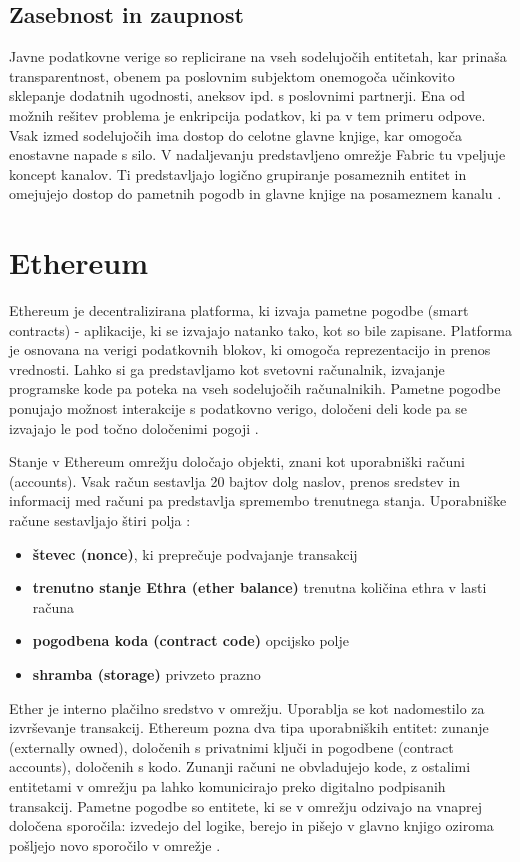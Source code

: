 \documentclass[a4paper, 12pt]{book}
\begin{document}
\subsection{Zasebnost in zaupnost}
Javne podatkovne verige so replicirane na vseh sodelujočih entitetah, kar prinaša transparentnost, obenem pa poslovnim subjektom onemogoča učinkovito sklepanje dodatnih ugodnosti, aneksov ipd. s poslovnimi partnerji.
Ena od možnih rešitev problema je enkripcija podatkov, ki pa v tem primeru odpove.
Vsak izmed sodelujočih ima dostop do celotne glavne knjige, kar omogoča enostavne napade s silo.
V nadaljevanju predstavljeno omrežje Fabric tu vpeljuje koncept kanalov.
Ti predstavljajo logično grupiranje posameznih entitet in omejujejo dostop do pametnih pogodb in glavne knjige na posameznem kanalu \cite{hyperledgerDocs}.

\section{Ethereum}
Ethereum je decentralizirana platforma, ki izvaja pametne pogodbe (smart contracts) - aplikacije, ki se izvajajo natanko tako, kot so bile zapisane.
Platforma je osnovana na verigi podatkovnih blokov, ki omogoča reprezentacijo in prenos vrednosti.
Lahko si ga predstavljamo kot svetovni računalnik, izvajanje programske kode pa poteka na vseh sodelujočih računalnikih.
Pametne pogodbe ponujajo možnost interakcije s podatkovno verigo, določeni deli kode pa se izvajajo le pod točno določenimi pogoji \cite{ethereumWhitepaper}.

Stanje v Ethereum omrežju določajo objekti, znani kot uporabniški računi (accounts).
Vsak račun sestavlja 20 bajtov dolg naslov, prenos sredstev in informacij med računi pa predstavlja spremembo trenutnega stanja.
Uporabniške račune sestavljajo štiri polja \cite{ethereumWhitepaper}:
\begin{itemize}
\item \textbf{števec (nonce)}, ki preprečuje podvajanje transakcij
\item \textbf{trenutno stanje Ethra (ether balance)} trenutna količina ethra v lasti računa
\item \textbf{pogodbena koda (contract code)} opcijsko polje
\item \textbf{shramba (storage)} privzeto prazno
\end{itemize}

Ether je interno plačilno sredstvo v omrežju.
Uporablja se kot nadomestilo za izvrševanje transakcij.
Ethereum pozna dva tipa uporabniških entitet: zunanje (externally owned), določenih s privatnimi ključi in pogodbene (contract accounts), določenih s kodo.
Zunanji računi ne obvladujejo kode, z ostalimi entitetami v omrežju pa lahko komunicirajo preko digitalno podpisanih transakcij.
Pametne pogodbe so entitete, ki se v omrežju odzivajo na vnaprej določena sporočila: izvedejo del logike, berejo in pišejo v glavno knjigo oziroma pošljejo novo sporočilo v omrežje \cite{ethereumWhitepaper}.
\end{document}
